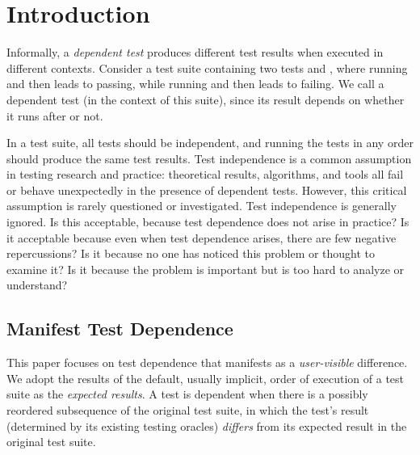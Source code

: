 \section{Introduction}


Informally, a \emph{dependent test} produces different test
results when executed in different contexts. Consider a test
suite containing two tests 
and , where running  and then  leads
to  passing, while running  and then
 leads to  failing. We call 
a dependent test (in the context of this suite), since its result depends on
whether it runs after  or not.


In a test suite, all tests should be independent, and
running the tests in any order should produce the same test results.
Test independence is a common assumption in testing research and practice:
theoretical results, algorithms, and tools all fail or behave unexpectedly
in the presence of dependent tests.
However, this critical assumption is rarely questioned or investigated. Test
independence is generally ignored.
Is this acceptable, because test dependence does
not arise in practice?
Is it acceptable because even when test dependence arises, there are few
negative repercussions?
Is it because no one has noticed this problem or thought to examine it?
Is it because the problem is important but is too hard to analyze or understand?

\subsection{Manifest Test Dependence}

This paper focuses on test dependence that manifests as a \textit{user-visible}
difference. We adopt the results of the default, usually
implicit, order of execution of a test suite as the
\textit{expected results}. A test is dependent when there is a possibly
reordered subsequence of the original test suite, in which
the test's result (determined by its existing testing
oracles) \textit{differs} from its expected result in the
original test suite.

